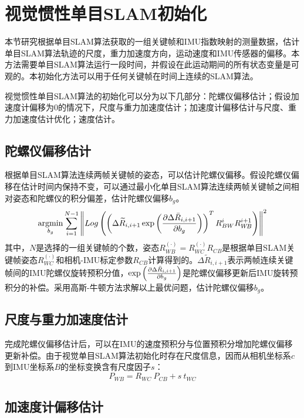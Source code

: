 \section{视觉惯性单目SLAM初始化}
本节研究根据单目SLAM算法获取的一组关键帧和IMU指数映射的测量数据，估计单目SLAM算法轨迹的尺度，重力加速度方向，运动速度和IMU传感器的偏移。本方法需要单目SLAM算法运行一段时间，并假设在此运动期间的所有状态变量是可观的。本初始化方法可以用于任何关键帧在时间上连续的SLAM算法。

视觉惯性单目SLAM算法的初始化可以分为以下几部分：陀螺仪偏移估计；假设加速度计偏移为0的情况下，尺度与重力加速度估计；加速度计偏移估计与尺度、重力加速度估计优化；速度估计。

\subsection{陀螺仪偏移估计}
根据单目SLAM算法连续两帧关键帧的姿态，可以估计陀螺仪偏移。假设陀螺仪偏移在估计时间内保持不变，可以通过最小化单目SLAM算法连续两帧关键帧之间相对姿态和陀螺仪的积分偏差，估计陀螺仪偏移$b_g$。
\begin{equation}
\label{•}
\operatorname*{argmin}\limits_{b_g}\sum\limits_{i=1}^{N-1} \left \Vert Log \left( \left( \Delta \widetilde{R}_{i,i+1} \exp \left( { \partial \Delta \bar{R}_{i,i+1} \over \partial b_g  } \right) \right)^T R_{BW}^i R_{W\!B}^{i+1} \right)  \right \Vert^2
\end{equation}
其中，$N$是选择的一组关键帧的个数，姿态$R_{W\!B}^{(\cdot)}=R_{WC}^{(\cdot)}R_{CB}$是根据单目SLAM关键帧姿态$R_{WC}^{(\cdot)}$和相机-IMU标定参数$R_{CB}$计算得到的。$\Delta \widetilde{R}_{i,i+1}$表示两帧连续关键帧间的IMU陀螺仪旋转预积分值，$\exp \left( { \partial \Delta \bar{R}_{i,i+1} \over \partial b_g  } \right)$是陀螺仪偏移更新后IMU旋转预积分的补偿。采用高斯-牛顿方法求解以上最优问题，估计陀螺仪偏移$b_g$。


\subsection{尺度与重力加速度估计}
完成陀螺仪偏移估计后，可以在IMU的速度预积分与位置预积分增加陀螺仪偏移更新补偿。由于视觉单目SLAM算法初始化时存在尺度信息，因而从相机坐标系$c$到IMU坐标系$B$的坐标变换含有尺度因子$s$：
\begin{equation}
\label{•}
P_{W\!B} = R_{WC}\ P_{CB} + s\ t_{WC} 
\end{equation}





\subsection{加速度计偏移估计}



